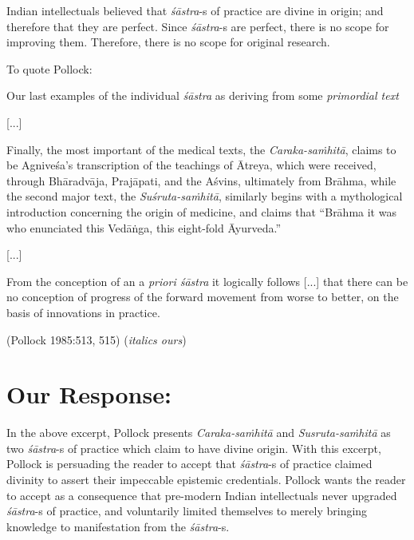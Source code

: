 Indian intellectuals believed that {{\sl śāstra}\relax}-s of practice are divine in origin; and therefore that they are perfect. Since {{\sl śāstra}\relax}-s are perfect, there is no scope for improving them. Therefore, there is no scope for original research.

To quote Pollock:
\begin{myquote}
Our last examples of the individual {\sl śāstra} as deriving from some {\sl primordial text}

[...]

Finally, the most important of the medical texts, the {\sl Caraka-saṁhitā}, claims to be Agniveśa's transcription of the teachings of Ātreya, which were received, through Bhāradvāja, Prajāpati, and the Aśvins, ultimately from Brāhma, while the second major text, the {\sl Suśruta-saṁhitā}, similarly begins with a mythological introduction concerning the origin of medicine, and claims that ``Brāhma it was who enunciated this Vedāṅga, this eight-fold Āyurveda.''

[...]

\newpage

From the conception of an a {\sl priori śāstra} it logically follows [...] that there can be no conception of progress of the forward movement from worse to better, on the basis of innovations in practice. 

\hfill (Pollock 1985:513, 515) ({\sl italics ours})
\end{myquote}

\section*{Our Response:}

In the above excerpt, Pollock presents {\sl Caraka-saṁhitā} and {\sl Susruta-saṁhitā} as two {\sl śāstra}-s of practice which claim to have divine origin.  With this excerpt, Pollock is persuading the reader to accept that {\sl śāstra}-s of practice claimed divinity to assert their impeccable epistemic credentials. Pollock wants the reader to accept as a consequence that pre-modern Indian intellectuals never upgraded {\sl śāstra}-s of practice, and voluntarily limited themselves to merely bringing knowledge to manifestation from the {\sl śāstra}-s.


